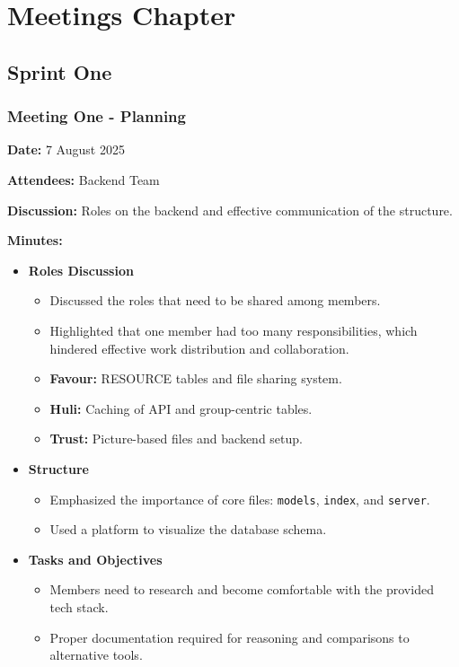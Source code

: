 \chapter{Meetings Chapter}

\section{Sprint One}

\subsection{Meeting One - Planning}

\textbf{Date:} 7 August 2025 \par
\textbf{Attendees:} Backend Team \par
\textbf{Discussion:} Roles on the backend and effective communication of the structure. \par

\textbf{Minutes:}
\begin{itemize}
    \item \textbf{Roles Discussion}
    \begin{itemize}
        \item Discussed the roles that need to be shared among members. 
        \item Highlighted that one member had too many responsibilities, which hindered effective work distribution and collaboration.
        \item \textbf{Favour:} RESOURCE tables and file sharing system.
        \item \textbf{Huli:} Caching of API and group-centric tables.
        \item \textbf{Trust:} Picture-based files and backend setup.
    \end{itemize}
    
    \item \textbf{Structure}
    \begin{itemize}
        \item Emphasized the importance of core files: \texttt{models}, \texttt{index}, and \texttt{server}.
        \item Used a platform to visualize the database schema.
    \end{itemize}
    
    \item \textbf{Tasks and Objectives}
    \begin{itemize}
        \item Members need to research and become comfortable with the provided tech stack.
        \item Proper documentation required for reasoning and comparisons to alternative tools.
    \end{itemize}
\end{itemize}


